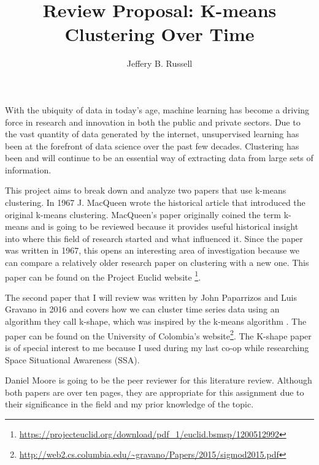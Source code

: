 \documentclass[12pt]{apa6}
\title{Review Proposal: K-means Clustering Over Time}
\author{Jeffery B. Russell}
\affiliation{%
 Fourth Year Computer Science Student at RIT\\
 CUBRC Research Assistant\\
 RITlug President
}%
\begin{document}
\maketitle


With the ubiquity of data in today's age, machine learning has become a driving force in research and innovation in both the public and private sectors. Due to the vast quantity of data generated by the internet, unsupervised learning has been at the forefront of data science over the past few decades. Clustering has been and will continue to be an essential way of extracting data from large sets of information.

This project aims to break down and analyze two papers that use k-means clustering. In 1967 J. MacQueen wrote the historical article that introduced \cite{k-means} the original k-means clustering. MacQueen's paper originally coined the term k-means\cite{k-means} and is going to be reviewed because it provides useful historical insight into where this field of research started and what influenced it. Since the paper was written in 1967, this opens an interesting area of investigation because we can compare a relatively older research paper on clustering with a new one. This paper can be found on the Project Euclid website \footnote{\url{https://projecteuclid.org/download/pdf_1/euclid.bsmsp/1200512992}}.

The second paper that I will review was written by John Paparrizos and Luis Gravano in 2016 and covers how we can cluster time series data using an algorithm they call k-shape, which was inspired by the k-means algorithm \cite{k-shape}. The paper can be found on the University of Colombia's website\footnote{\url{http://web2.cs.columbia.edu/~gravano/Papers/2015/sigmod2015.pdf}}.
The K-shape paper is of special interest to me because I used during my last co-op while researching Space Situational Awareness (SSA).

Daniel Moore is going to be the peer reviewer for this literature review.
Although both papers are over ten pages, they are appropriate for this assignment due to their significance in the field and my prior knowledge of the topic. 




\end{document}
